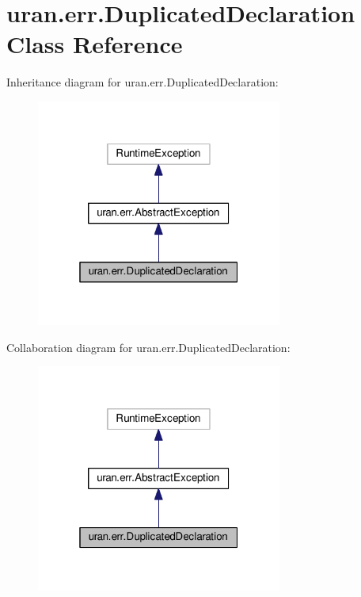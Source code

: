 \hypertarget{classuran_1_1err_1_1_duplicated_declaration}{}\section{uran.\+err.\+Duplicated\+Declaration Class Reference}
\label{classuran_1_1err_1_1_duplicated_declaration}


Inheritance diagram for uran.\+err.\+Duplicated\+Declaration\+:
\nopagebreak
\begin{figure}[H]
\begin{center}
\leavevmode
\includegraphics[width=229pt]{classuran_1_1err_1_1_duplicated_declaration__inherit__graph}
\end{center}
\end{figure}


Collaboration diagram for uran.\+err.\+Duplicated\+Declaration\+:
\nopagebreak
\begin{figure}[H]
\begin{center}
\leavevmode
\includegraphics[width=229pt]{classuran_1_1err_1_1_duplicated_declaration__coll__graph}
\end{center}
\end{figure}
